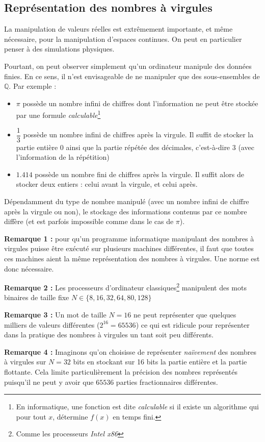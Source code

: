 \documentclass[../../main.tex]{subfiles}
\begin{document}
\subsection{Représentation des nombres à virgules}
La manipulation de valeurs réelles est extrêmement importante, et même nécessaire, pour la manipulation d'espaces continues. On peut en particulier penser à des simulations physiques.

Pourtant, on peut observer simplement qu'un ordinateur manipule des données finies. En ce sens, il n'est envisageable de ne manipuler que des sous-ensembles de $\mathbb{Q}$. Par exemple :
\begin{itemize}
     \item $\pi$ possède un nombre infini de chiffres dont l'information ne peut être stockée par une formule \textit{calculable}\footnote{En informatique, une fonction est dite \textit{calculable} si il existe un algorithme qui pour tout $x$, détermine $f(x)$ en temps fini.}
     \item $\dfrac{1}{3}$ possède un nombre infini de chiffres après la virgule. Il suffit de stocker la partie entière $0$ ainsi que la partie répétée des décimales, c'est-à-dire $3$ (avec l'information de la répétition)
     \item $1.414$ possède un nombre fini de chiffres après la virgule. Il suffit alors de stocker deux entiers : celui avant la virgule, et celui après.
\end{itemize}
Dépendamment du type de nombre manipulé (avec un nombre infini de chiffre après la virgule ou non), le stockage des informations contenus par ce nombre diffère (et est parfois impossible comme dans le cas de $\pi$).

\textbf{Remarque 1 :} pour qu'un programme informatique manipulant des nombres à virgules puisse être exécuté sur plusieurs machines différentes, il faut que toutes ces machines aient la même représentation des nombres à virgules. Une norme est donc nécessaire.

\textbf{Remarque 2 :} Les processeurs d'ordinateur classiques\footnote{Comme les processeurs \textit{Intel x86}} manipulent des mots binaires de taille fixe $N\in\{8, 16, 32, 64, 80, 128\}$

\textbf{Remarque 3 :} Un mot de taille $N = 16$ ne peut représenter que quelques milliers de valeurs différentes ($2^{16} = 65536$) ce qui est ridicule pour représenter dans la pratique des nombres à virgules un tant soit peu différents.

\textbf{Remarque 4 :} Imaginons qu'on choisisse de représenter \textit{naïvement} des nombres à virgules sur $N = 32$ bits en stockant sur 16 bits la partie entière et la partie flottante. Cela limite particulièrement la précision des nombres représentés puisqu'il ne peut y avoir que $65536$ parties fractionnaires différentes.
\end{document}
